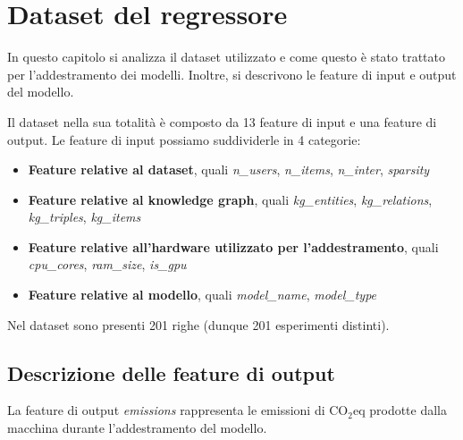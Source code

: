 \section{Dataset del regressore}
In questo capitolo si analizza il dataset utilizzato e come questo è stato trattato per l'addestramento dei modelli. Inoltre, si descrivono le feature di input e output del modello.

\noindent Il dataset nella sua totalità è composto da 13 feature di input e una feature di output. Le feature di input possiamo suddividerle in 4 categorie:
\begin{itemize}
    \item \textbf{Feature relative al dataset}, quali \textit{n\_users}, \textit{n\_items}, \textit{n\_inter}, \textit{sparsity}
    \item \textbf{Feature relative al knowledge graph}, quali \textit{kg\_entities}, \textit{kg\_relations}, \textit{kg\_triples}, \textit{kg\_items}
    \item \textbf{Feature relative all'hardware utilizzato per l'addestramento}, quali \textit{cpu\_cores}, \textit{ram\_size}, \textit{is\_gpu}
    \item \textbf{Feature relative al modello}, quali \textit{model\_name}, \textit{model\_type}
\end{itemize}
Nel dataset sono presenti 201 righe (dunque 201 esperimenti distinti).
\subsection{Descrizione delle feature di output}
La feature di output \textit{emissions} rappresenta le emissioni di CO$_2$eq prodotte dalla macchina durante l'addestramento del modello.
